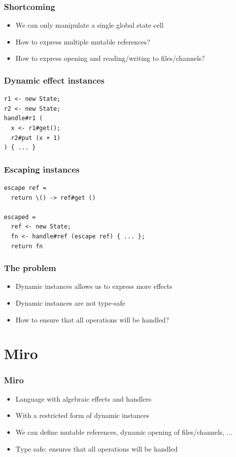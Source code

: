 \documentclass{beamer}
\begin{document}
\begin{frame}[fragile]\frametitle{Shortcoming}
\begin{itemize}
\item We can only manipulate a single global state cell
\item How to express multiple mutable references?
\item How to express opening and reading/writing to files/channels?
\end{itemize}
\end{frame}

\begin{frame}[fragile]\frametitle{Dynamic effect instances}
	\begin{example}
		\begin{verbatim}
r1 <- new State;
r2 <- new State;
handle#r1 (
  x <- r1#get();
  r2#put (x + 1)
) { ... }
		\end{verbatim}
	\end{example}
\end{frame}

\begin{frame}[fragile]\frametitle{Escaping instances}
	\begin{example}
		\begin{verbatim}
escape ref =
  return \() -> ref#get ()

escaped =
  ref <- new State;
  fn <- handle#ref (escape ref) { ... };
  return fn
		\end{verbatim}
	\end{example}
\end{frame}

\begin{frame}[fragile]\frametitle{The problem}
\begin{itemize}
\item Dynamic instances allows us to express more effects
\item Dynamic instances are not type-safe
\item How to ensure that all operations will be handled?
\end{itemize}
\end{frame}

\section{Miro}

\begin{frame}[fragile]\frametitle{Miro}
\begin{itemize}
\item Language with algebraic effects and handlers
\item With a restricted form of dynamic instances
\item We can define mutable references, dynamic opening of files/channels, ...
\item Type safe: ensures that all operations will be handled
\end{itemize}
\end{frame}
\end{document}
